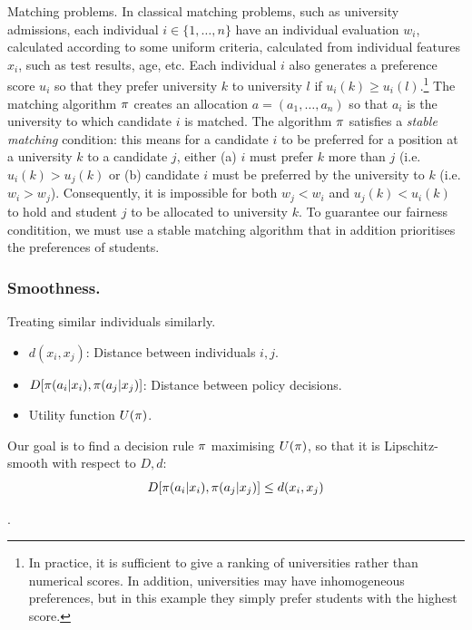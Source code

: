 \begin{frame}
  \begin{example}{Matching problems.}
    In classical matching problems, such as university admissions,
    each individual $i \in \{1, \ldots, n\}$ have an individual
    evaluation $w_i$, calculated according to some uniform criteria,
    calculated from individual features $x_i$, such as test results,
    age, etc. Each individual $i$ also generates a preference score
    $u_i$ so that they prefer university $k$ to university $l$ if
    $u_i(k) \geq u_i(l)$.\footnote{In practice, it is sufficient to
      give a ranking of universities rather than numerical scores. In
      addition, universities may have inhomogeneous preferences, but
      in this example they simply prefer students with the highest
      score.}  The matching algorithm $\pi$ creates an allocation
    $a=(a_1, \ldots, a_n)$ so that $a_i$ is the university to which
    candidate $i$ is matched. The algorithm $\pi$ satisfies a
    \emph{stable matching} condition: this means for a candidate $i$
    to be preferred for a position at a university $k$ to a candidate
    $j$, either (a) $i$ must prefer $k$ more than $j$ (i.e.
    $u_i(k) > u_j(k)$ or (b) candidate $i$ must be preferred by the
    university to $k$ (i.e. $w_i > w_j$). Consequently, it is
    impossible for both $w_j < w_i$ and $u_j(k) < u_i(k)$ to hold and
    student $j$ to be allocated to university $k$. To guarantee our
    fairness conditition, we must use a stable matching algorithm that
    in addition prioritises the preferences of students.
  \end{example}

\end{frame}

\begin{frame}\frametitle{Smoothness.}
  \begin{block}{Treating similar individuals similarly.}
    \begin{itemize}
    \item $d(x_i,x_j)$: Distance between individuals $i,j$.
    \item $D[\pi(a_i | x_i), \pi(a_j | x_j)]$: Distance between policy decisions.
    \item Utility function $U(\pi)$.
    \end{itemize}
    Our goal is to find a decision rule $\pi$ maximising  $U(\pi)$, 
    so that it is Lipschitz-smooth with respect to $D, d$:
    \[
      D[\pi(a_i | x_i), \pi(a_j | x_j)] \leq d(x_i,x_j)
    \]
  \end{block}
  .
\end{frame}

